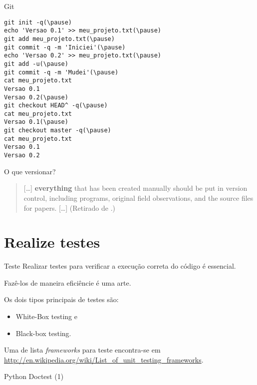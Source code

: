 \documentclass[11pt]{beamer}
\begin{document}
\begin{frame}[fragile]{Git}
    \begin{example}
        \begin{lstlisting}[escapeinside=()]
git init -q(\pause)
echo 'Versao 0.1' >> meu_projeto.txt(\pause)
git add meu_projeto.txt(\pause)
git commit -q -m 'Iniciei'(\pause)
echo 'Versao 0.2' >> meu_projeto.txt(\pause)
git add -u(\pause)
git commit -q -m 'Mudei'(\pause)
cat meu_projeto.txt
Versao 0.1
Versao 0.2(\pause)
git checkout HEAD^ -q(\pause)
cat meu_projeto.txt
Versao 0.1(\pause)
git checkout master -q(\pause)
cat meu_projeto.txt
Versao 0.1
Versao 0.2
        \end{lstlisting}
    \end{example}
\end{frame}

\begin{frame}{O que versionar?}
    \begin{quotation}
        [\ldots] \textbf<2>{everything} that has been created manually should be put in
        version control, including programs, original field observations, and
        the source files for papers. [\ldots] (Retirado de \cite{Aruliah-2012-Best}.)
    \end{quotation}
\end{frame}

\section{Realize testes}
\begin{frame}{Teste}
    Realizar testes para verificar a execução correta do código é essencial.
    
    Fazê-los de maneira eficiêncie é uma arte.

    \pause
    Os dois tipos principais de testes são:
    \begin{itemize}
        \item White-Box testing e
        \item Black-box testing.
    \end{itemize}

    \pause
    Uma de lista \textit{frameworks} para teste encontra-se em
    \url{http://en.wikipedia.org/wiki/List_of_unit_testing_frameworks}.
\end{frame}

\begin{frame}[fragile]{Python Doctest (1)}
    \begin{example}
        
    \end{example}
\end{frame}
\end{document}
